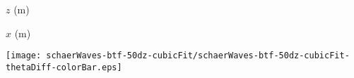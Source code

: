 \documentclass{article}
\begin{document}
$z$ (\si{\meter}) 

\vspace{0.5em}
\hspace*{23.7em}$x$ (\si{\meter})

\centering \texttt{[image: schaerWaves-btf-50dz-cubicFit/schaerWaves-btf-50dz-cubicFit-thetaDiff-colorBar.eps]}
\end{document}

